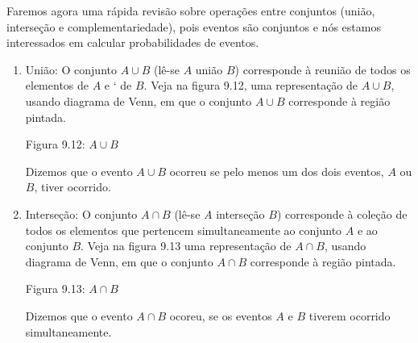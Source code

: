Faremos agora uma rápida revisão sobre operações entre conjuntos (união, interseção e complementariedade), pois eventos são conjuntos e nós estamos interessados em calcular probabilidades de eventos.
\begin{enumerate}
\item {} 
União: O conjunto \(A\cup B\) (lê-se \(A\)  união \(B\)) corresponde à reunião de todos os elementos de \(A\) e {}` de \(B\). Veja na figura 9.12, uma representação de \(A\cup B\), usando diagrama de Venn, em que o conjunto \(A\cup B\) corresponde à região pintada.
\label{\detokenize{PE511-1:fig-coloque-aqui-o-nome}}
\begin{figure}[H]
\centering

\noindent{}
\label{\detokenize{PE511-1:fig-coloque-aqui-o-nome}}\end{figure}

Figura 9.12: \(A\cup B\)

Dizemos que o evento \(A\cup B\) ocorreu se pelo menos um dos dois eventos, \(A\) ou \(B\), tiver ocorrido.

\item {} 
Interseção: O conjunto \(A\cap B\) (lê-se \(A\) interseção \(B\)) corresponde à coleção de todos os elementos que pertencem simultaneamente ao conjunto \(A\) e ao conjunto \(B\). Veja na figura 9.13 uma representação de \(A\cap B\), usando diagrama de Venn, em que o conjunto \(A\cap B\) corresponde à região pintada.
\begin{quote}
\begin{center}\end{center}\end{quote}

Figura 9.13: \(A\cap B\)

Dizemos que o evento \(A \cap B\) ocoreu, se os eventos \(A\) e \(B\) tiverem ocorrido simultaneamente.


\end{enumerate}
